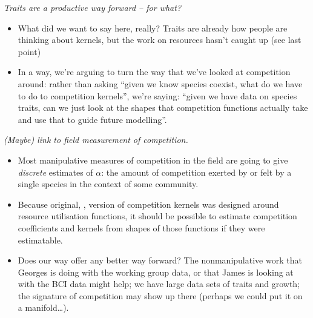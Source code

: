 \documentclass[a4paper,11pt]{article}
\begin{document}
\textit{Traits are a productive way forward -- for what?}
\begin{itemize}
\item What did we want to say here, really?  Traits are already how
  people are thinking about kernels, but the work on resources hasn't
  caught up (see last point)
\item In a way, we're arguing to turn the way that we've looked at
  competition around: rather than asking ``given we know species
  coexist, what do we have to do to competition kernels'', we're
  saying: ``given we have data on species traits, can we just look at
  the shapes that competition functions actually take and use that to
  guide future modelling''.
\end{itemize}

\textit{(Maybe) link to field measurement of competition.}
\begin{itemize}
\item Most manipulative measures of competition in the field are going
  to give \emph{discrete} estimates of $\alpha$: the amount of
  competition exerted by or felt by a single species in the context of
  some community.
\item Because original, \citet{MacArthur-1967}, version of competition
  kernels was designed around resource utilisation functions, it
  should be possible to estimate competition coefficients and kernels
  from shapes of those functions if they were estimatable.
\item Does our way offer any better way forward?  The nonmanipulative
  work that Georges is doing with the working group data, or that
  James is looking at with the BCI data might help; we have large data
  sets of traits and growth; the signature of competition may show up
  there (perhaps we could put it on a manifold\ldots).
\end{itemize}
\end{document}
